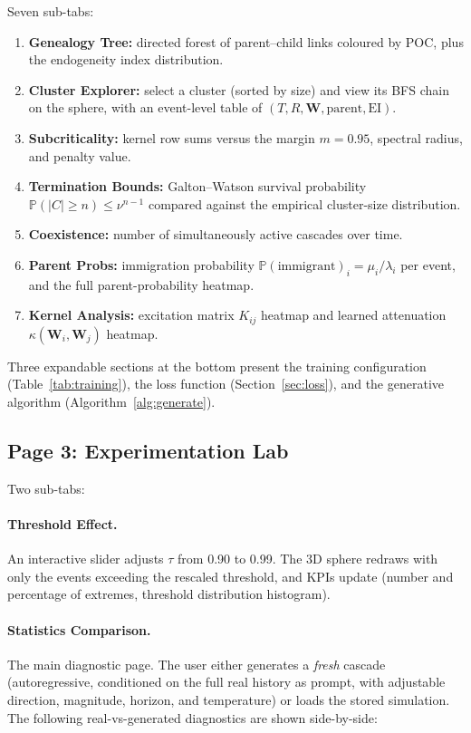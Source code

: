 \documentclass[11pt,a4paper]{article}
\newcommand{\bW}{\boldsymbol{W}}
\newcommand{\Prob}{\mathbb{P}}
\begin{document}
Seven sub-tabs:
\begin{enumerate}[nosep]
  \item \textbf{Genealogy Tree:} directed forest of parent--child
        links coloured by POC, plus the endogeneity index distribution.
  \item \textbf{Cluster Explorer:} select a cluster (sorted by size)
        and view its BFS chain on the sphere, with an event-level
        table of $(T, R, \bW, \text{parent}, \text{EI})$.
  \item \textbf{Subcriticality:} kernel row sums versus the margin $m = 0.95$,
        spectral radius, and penalty value.
  \item \textbf{Termination Bounds:} Galton--Watson survival probability
        $\Prob(|C| \ge n) \le \nu^{n-1}$ compared against the empirical
        cluster-size distribution.
  \item \textbf{Coexistence:} number of simultaneously active cascades
        over time.
  \item \textbf{Parent Probs:} immigration probability
        $\Prob(\text{immigrant})_i = \mu_i / \lambda_i$ per event,
        and the full parent-probability heatmap.
  \item \textbf{Kernel Analysis:} excitation matrix $K_{ij}$ heatmap
        and learned attenuation $\kappa(\bW_i, \bW_j)$ heatmap.
\end{enumerate}

Three expandable sections at the bottom present the training
configuration (Table~\ref{tab:training}), the loss function
(Section~\ref{sec:loss}), and the generative algorithm
(Algorithm~\ref{alg:generate}).

\subsection{Page 3: Experimentation Lab}

Two sub-tabs:

\paragraph{Threshold Effect.}
An interactive slider adjusts $\tau$ from 0.90 to 0.99.
The 3D sphere redraws with only the events exceeding the
rescaled threshold, and KPIs update (number and percentage
of extremes, threshold distribution histogram).

\paragraph{Statistics Comparison.}
The main diagnostic page.
The user either generates a \emph{fresh} cascade
(autoregressive, conditioned on the full real history as prompt,
with adjustable direction, magnitude, horizon, and temperature)
or loads the stored simulation.
The following real-vs-generated diagnostics are shown side-by-side:
\end{document}
